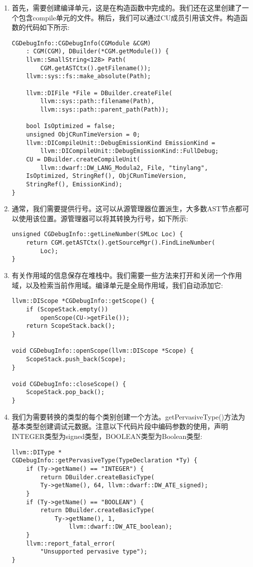 \begin{enumerate}
\item 首先，需要创建编译单元，这是在构造函数中完成的。我们还在这里创建了一个包含compile单元的文件。稍后，我们可以通过CU成员引用该文件。构造函数的代码如下所示:
\begin{lstlisting}[caption={}]
CGDebugInfo::CGDebugInfo(CGModule &CGM)
	: CGM(CGM), DBuilder(*CGM.getModule()) {
	llvm::SmallString<128> Path(
		CGM.getASTCtx().getFilename());
	llvm::sys::fs::make_absolute(Path);
	
	llvm::DIFile *File = DBuilder.createFile(
		llvm::sys::path::filename(Path),
		llvm::sys::path::parent_path(Path));
		
	bool IsOptimized = false;
	unsigned ObjCRunTimeVersion = 0;
	llvm::DICompileUnit::DebugEmissionKind EmissionKind =
		llvm::DICompileUnit::DebugEmissionKind::FullDebug;
	CU = DBuilder.createCompileUnit(
		llvm::dwarf::DW_LANG_Modula2, File, "tinylang",
	IsOptimized, StringRef(), ObjCRunTimeVersion,
	StringRef(), EmissionKind);
}
\end{lstlisting}

\item 通常，我们需要提供行号。这可以从源管理器位置派生，大多数AST节点都可以使用该位置。源管理器可以将其转换为行号，如下所示:
\begin{lstlisting}[caption={}]
unsigned CGDebugInfo::getLineNumber(SMLoc Loc) {
	return CGM.getASTCtx().getSourceMgr().FindLineNumber(
		Loc);
}
\end{lstlisting}

\item 有关作用域的信息保存在堆栈中。我们需要一些方法来打开和关闭一个作用域，以及检索当前作用域。编译单元是全局作用域，我们自动添加它:
\begin{lstlisting}[caption={}]
llvm::DIScope *CGDebugInfo::getScope() {
	if (ScopeStack.empty())
		openScope(CU->getFile());
	return ScopeStack.back();
}

void CGDebugInfo::openScope(llvm::DIScope *Scope) {
	ScopeStack.push_back(Scope);
}

void CGDebugInfo::closeScope() {
	ScopeStack.pop_back();
}
\end{lstlisting}

\item 我们为需要转换的类型的每个类别创建一个方法。getPervasiveType()方法为基本类型创建调试元数据。注意以下代码片段中编码参数的使用，声明INTEGER类型为signed类型，BOOLEAN类型为Boolean类型:
\begin{lstlisting}[caption={}]
llvm::DIType *
CGDebugInfo::getPervasiveType(TypeDeclaration *Ty) {
	if (Ty->getName() == "INTEGER") {
		return DBuilder.createBasicType(
		Ty->getName(), 64, llvm::dwarf::DW_ATE_signed);
	}
	if (Ty->getName() == "BOOLEAN") {
		return DBuilder.createBasicType(
			Ty->getName(), 1, 
				llvm::dwarf::DW_ATE_boolean);
	}
	llvm::report_fatal_error(
		"Unsupported pervasive type");
}
\end{lstlisting}


\end{enumerate}
